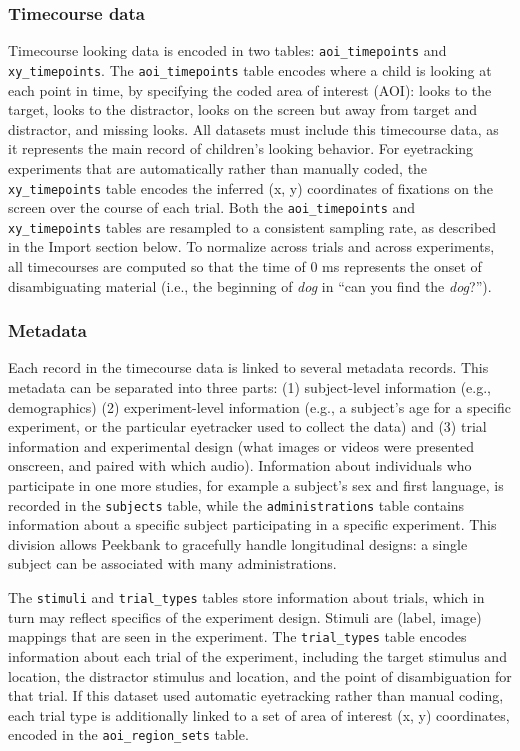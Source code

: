 \documentclass[
  english,
  man,floatsintext]{apa6}
\begin{document}
\hypertarget{timecourse-data}{%
\subsubsection{Timecourse data}\label{timecourse-data}}

Timecourse looking data is encoded in two tables: \texttt{aoi\_timepoints} and \texttt{xy\_timepoints}.
The \texttt{aoi\_timepoints} table encodes where a child is looking at each point in time, by specifying the coded area of interest (AOI): looks to the target, looks to the distractor, looks on the screen but away from target and distractor, and missing looks.
All datasets must include this timecourse data, as it represents the main record of children's looking behavior.
For eyetracking experiments that are automatically rather than manually coded, the \texttt{xy\_timepoints} table encodes the inferred (x, y) coordinates of fixations on the screen over the course of each trial.
Both the \texttt{aoi\_timepoints} and \texttt{xy\_timepoints} tables are resampled to a consistent sampling rate, as described in the Import section below.
To normalize across trials and across experiments, all timecourses are computed so that the time of 0 ms represents the onset of disambiguating material (i.e., the beginning of \textit{dog} in \enquote{can you find the \textit{dog}?}).

\hypertarget{metadata}{%
\subsubsection{Metadata}\label{metadata}}

Each record in the timecourse data is linked to several metadata records.
This metadata can be separated into three parts: (1) subject-level information (e.g., demographics) (2) experiment-level information (e.g., a subject's age for a specific experiment, or the particular eyetracker used to collect the data) and (3) trial information and experimental design (what images or videos were presented onscreen, and paired with which audio).
Information about individuals who participate in one more studies, for example a subject's sex and first language, is recorded in the \texttt{subjects} table, while the \texttt{administrations} table contains information about a specific subject participating in a specific experiment.
This division allows Peekbank to gracefully handle longitudinal designs: a single subject can be associated with many administrations.

The \texttt{stimuli} and \texttt{trial\_types} tables store information about trials, which in turn may reflect specifics of the experiment design.
Stimuli are (label, image) mappings that are seen in the experiment.
The \texttt{trial\_types} table encodes information about each trial of the experiment, including the target stimulus and location, the distractor stimulus and location, and the point of disambiguation for that trial.
If this dataset used automatic eyetracking rather than manual coding, each trial type is additionally linked to a set of area of interest (x, y) coordinates, encoded in the \texttt{aoi\_region\_sets} table.
\end{document}
